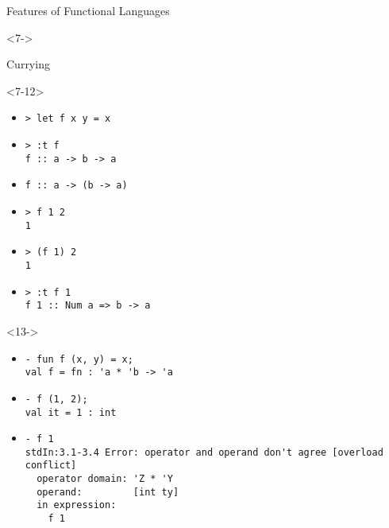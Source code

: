\documentclass{beamer}
\begin{document}
\begin{frame}[fragile]{Features of Functional Languages}
  \begin{onlyenv}<7->
    \begin{block}{Currying}
      \begin{onlyenv}<7-12>
        \begin{itemize}
        \item[]<7-> \begin{verbatim}
> let f x y = x
          \end{verbatim}
        \item[]<8-> \begin{verbatim}
> :t f
f :: a -> b -> a
          \end{verbatim}
        \item[]<9-> \begin{verbatim}
f :: a -> (b -> a)
          \end{verbatim}
        \item[]<10-> \begin{verbatim}
> f 1 2
1
          \end{verbatim}
        \item[]<11-> \begin{verbatim}
> (f 1) 2
1
          \end{verbatim}
        \item[]<12-> \begin{verbatim}
> :t f 1
f 1 :: Num a => b -> a
          \end{verbatim}
        \end{itemize}
      \end{onlyenv}

      \begin{onlyenv}<13->
        \begin{itemize}
        \item[]<13-> \begin{verbatim}
- fun f (x, y) = x;
val f = fn : 'a * 'b -> 'a
          \end{verbatim}
        \item[]<14-> \begin{verbatim}
- f (1, 2);
val it = 1 : int
          \end{verbatim}
        \item[]<15-> \begin{verbatim}
- f 1
stdIn:3.1-3.4 Error: operator and operand don't agree [overload conflict]
  operator domain: 'Z * 'Y
  operand:         [int ty]
  in expression:
    f 1
          \end{verbatim}
        \end{itemize}
      \end{onlyenv}
    \end{block}
  \end{onlyenv}
\end{frame}
\end{document}
